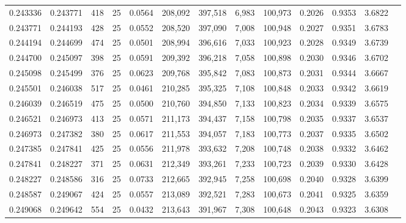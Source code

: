 \begin{tabular}{rrrrrrrrrrrrr}
0.243336 & 0.243771 &   418 &  25 &                                     0.0564 & 208,092 & 397,518 &   6,983 & 100,973 & 0.2026 & 0.9353 & 3.6822 \\
0.243771 & 0.244193 &   428 &  25 &                                     0.0552 & 208,520 & 397,090 &   7,008 & 100,948 & 0.2027 & 0.9351 & 3.6783 \\
0.244194 & 0.244699 &   474 &  25 &                                     0.0501 & 208,994 & 396,616 &   7,033 & 100,923 & 0.2028 & 0.9349 & 3.6739 \\
0.244700 & 0.245097 &   398 &  25 &                                     0.0591 & 209,392 & 396,218 &   7,058 & 100,898 & 0.2030 & 0.9346 & 3.6702 \\
0.245098 & 0.245499 &   376 &  25 &                                     0.0623 & 209,768 & 395,842 &   7,083 & 100,873 & 0.2031 & 0.9344 & 3.6667 \\
0.245501 & 0.246038 &   517 &  25 &                                     0.0461 & 210,285 & 395,325 &   7,108 & 100,848 & 0.2033 & 0.9342 & 3.6619 \\
0.246039 & 0.246519 &   475 &  25 &                                     0.0500 & 210,760 & 394,850 &   7,133 & 100,823 & 0.2034 & 0.9339 & 3.6575 \\
0.246521 & 0.246973 &   413 &  25 &                                     0.0571 & 211,173 & 394,437 &   7,158 & 100,798 & 0.2035 & 0.9337 & 3.6537 \\
0.246973 & 0.247382 &   380 &  25 &                                     0.0617 & 211,553 & 394,057 &   7,183 & 100,773 & 0.2037 & 0.9335 & 3.6502 \\
0.247385 & 0.247841 &   425 &  25 &                                     0.0556 & 211,978 & 393,632 &   7,208 & 100,748 & 0.2038 & 0.9332 & 3.6462 \\
0.247841 & 0.248227 &   371 &  25 &                                     0.0631 & 212,349 & 393,261 &   7,233 & 100,723 & 0.2039 & 0.9330 & 3.6428 \\
0.248227 & 0.248586 &   316 &  25 &                                     0.0733 & 212,665 & 392,945 &   7,258 & 100,698 & 0.2040 & 0.9328 & 3.6399 \\
0.248587 & 0.249067 &   424 &  25 &                                     0.0557 & 213,089 & 392,521 &   7,283 & 100,673 & 0.2041 & 0.9325 & 3.6359 \\
0.249068 & 0.249642 &   554 &  25 &                                     0.0432 & 213,643 & 391,967 &   7,308 & 100,648 & 0.2043 & 0.9323 & 3.6308 \\

\end{tabular}
